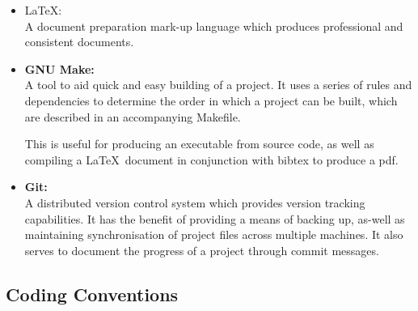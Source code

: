 \begin{itemize}
\item \LaTeX: \\   
            A document preparation mark-up language which produces professional and consistent 
            documents. 

\item \textbf{GNU Make:} \\ 
            A tool to aid quick and easy building of a project. It uses a series of 
            rules and dependencies to determine the order in which a project can be built, 
            which are described in an accompanying Makefile. 
                         
            This is useful for  producing an executable from source code, as well
            as compiling a \LaTeX~document in conjunction with bibtex to produce a pdf.

\item \textbf{Git:} \\     
            A distributed version control system which provides version tracking capabilities. 
            It has the benefit of providing a means of backing up, as-well as maintaining 
            synchronisation of project files across multiple machines.
            It also serves to document the progress of a project through commit messages.
\end{itemize}

\subsection*{Coding Conventions}

